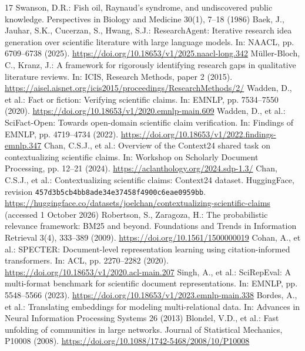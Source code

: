 \documentclass[runningheads]{llncs}
\begin{document}
\begin{thebibliography}{17}
 Swanson, D.R.: Fish oil, Raynaud's syndrome, and undiscovered public knowledge. Perspectives in Biology and Medicine 30(1), 7--18 (1986)
 Baek, J., Jauhar, S.K., Cucerzan, S., Hwang, S.J.: ResearchAgent: Iterative research idea generation over scientific literature with large language models. In: NAACL, pp. 6709--6738 (2025). \url{https://doi.org/10.18653/v1/2025.naacl-long.342}
 M\"uller-Bloch, C., Kranz, J.: A framework for rigorously identifying research gaps in qualitative literature reviews. In: ICIS, Research Methods, paper 2 (2015). \url{https://aisel.aisnet.org/icis2015/proceedings/ResearchMethods/2/}
 Wadden, D., et al.: Fact or fiction: Verifying scientific claims. In: EMNLP, pp. 7534--7550 (2020). \url{https://doi.org/10.18653/v1/2020.emnlp-main.609}
 Wadden, D., et al.: SciFact-Open: Towards open-domain scientific claim verification. In: Findings of EMNLP, pp. 4719--4734 (2022). \url{https://doi.org/10.18653/v1/2022.findings-emnlp.347}
 Chan, C.S.J., et al.: Overview of the Context24 shared task on contextualizing scientific claims. In: Workshop on Scholarly Document Processing, pp. 12--21 (2024). \url{https://aclanthology.org/2024.sdp-1.3/}
 Chan, C.S.J., et al.: Contextualizing scientific claims: Context24 dataset. HuggingFace, revision \texttt{457d3b5cb4bb8ade34e37458f4900c6eae0959bb}. \url{https://huggingface.co/datasets/joelchan/contextualizing-scientific-claims} (accessed 1 October 2026)
 Robertson, S., Zaragoza, H.: The probabilistic relevance framework: BM25 and beyond. Foundations and Trends in Information Retrieval 3(4), 333--389 (2009). \url{https://doi.org/10.1561/1500000019}
 Cohan, A., et al.: SPECTER: Document-level representation learning using citation-informed transformers. In: ACL, pp. 2270--2282 (2020). \url{https://doi.org/10.18653/v1/2020.acl-main.207}
 Singh, A., et al.: SciRepEval: A multi-format benchmark for scientific document representations. In: EMNLP, pp. 5548--5566 (2023). \url{https://doi.org/10.18653/v1/2023.emnlp-main.338}
 Bordes, A., et al.: Translating embeddings for modeling multi-relational data. In: Advances in Neural Information Processing Systems 26 (2013)
 Blondel, V.D., et al.: Fast unfolding of communities in large networks. Journal of Statistical Mechanics, P10008 (2008). \url{https://doi.org/10.1088/1742-5468/2008/10/P10008}

\end{thebibliography}
\end{document}
